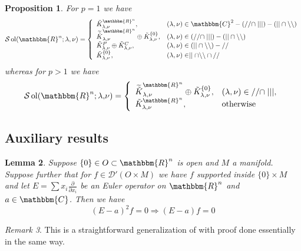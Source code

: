 \documentclass[12pt]{article}
\newcommand{\comma}{{,}}
\newcommand{\tmop}[1]{\ensuremath{\operatorname{#1}}}
\newtheorem{proposition}{Proposition}[section]
\newtheorem{lemma}[proposition]{Lemma}
\theoremstyle{remark}
\newtheorem{remark}[proposition]{Remark}
\begin{document}
\begin{proposition}
  \label{sol-MO:prop-main}For $p = 1$ we have
  \[ \mathcal{S} \tmop{ol} (\mathbbm{R}^n ; \lambda, \nu) = \left\{
     \begin{array}{ll}
       \tilde{K}_{\lambda, \nu}^{\mathbbm{R}^n}, & (\lambda, \nu) \in
       \mathbbm{C}^2 - (/ / \cap \mid \mid \mid) - (| | \cap
       \backslash\backslash)\\
       \widetilde{\tilde{K}}_{\lambda, \nu}^{\mathbbm{R}^n} \oplus
       \tilde{K}^{\{ 0 \}}_{\lambda, \nu}, & (\lambda, \nu) \in (/ / \cap \mid
       \mid \mid) - (| | \cap \backslash\backslash)\\
       \tilde{K}_{\lambda, \nu}^P \oplus \tilde{K}_{\lambda, \nu}^C, &
       (\lambda, \nu) \in (| | \cap \backslash\backslash) - / /\\
       \tilde{K}^{\{ 0 \}}_{\lambda, \nu}, & (\lambda, \nu) \in \mid
       \mid \cap \backslash\backslash \cap / /
     \end{array} \right. \]
  whereas for $p > 1$ we have
  \[ \mathcal{S} \tmop{ol} (\mathbbm{R}^n ; \lambda \comma \nu) = \left\{
     \begin{array}{ll}
       \widetilde{\tilde{K}}_{\lambda, \nu}^{\mathbbm{R}^n} \oplus
       \tilde{K}^{\{ 0 \}}_{\lambda, \nu}, & (\lambda, \nu) \in / / \cap \mid
       \mid \mid,\\
       \tilde{K}^{\mathbbm{R}^n}_{\lambda, \nu}, & \tmop{otherwise}
     \end{array} \right. \]
\end{proposition}

\subsection{Auxiliary results}

\begin{lemma}
  \label{sol-MO:lem-E2}Suppose $\{ 0 \} \in O \subset \mathbbm{R}^n$ is open
  and $M$ a manifold. Suppose further that for $f \in \mathcal{D}' (O \times
  M)$ we have $f$ supported inside $\{ 0 \} \times M$ and let $E = \sum x_i
  \frac{\partial}{\partial x_i}$ be an Euler operator on $\mathbbm{R}^n$ and
  $a \in \mathbbm{C}$. Then we have
  \[ (E - a)^2 f = 0 \Rightarrow (E - a) f = 0 \]
\end{lemma}

\begin{remark}
  This is a straightforward generalization of {\cite[lem.
  11.11]{kobayashi2015symmetry}} with proof done essentially in the same way.
\end{remark}
\end{document}
